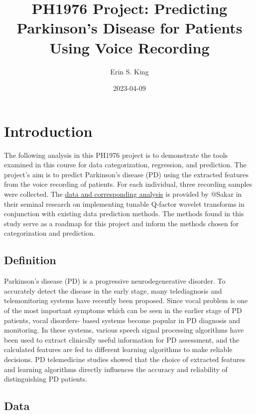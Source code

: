 \documentclass[
]{article}
\title{PH1976 Project: Predicting Parkinson's Disease for Patients Using Voice Recording}
\author{Erin S. King}
\date{2023-04-09}
\begin{document}
\maketitle

{
\setcounter{tocdepth}{2}
\tableofcontents
}
\hypertarget{introduction}{%
\section{Introduction}\label{introduction}}

The following analysis in this PH1976 project is to demonstrate the tools examined in this course for data categorization, regression, and prediction. The project's aim is to predict Parkinson's disease (PD) using the extracted features from the voice recording of patients. For each individual, three recording samples were collected. The \href{https://doi.org/10.1016/j.asoc.2018.10.022}{data and corresponding analysis} is provided by @Sakar in their seminal research on implementing tunable Q-factor wavelet transforms in conjunction with existing data prediction methods. The methods found in this study serve as a roadmap for this project and inform the methods chosen for categorization and prediction.

\hypertarget{definition}{%
\subsection{Definition}\label{definition}}

Parkinson's disease (PD) is a progressive neurodegenerative disorder. To accurately detect the disease in the
early stage, many telediagnosis and telemonitoring systems have recently been proposed. Since vocal problem is
one of the most important symptoms which can be seen in the earlier stage of PD patients, vocal disorders-
based systems become popular in PD diagnosis and monitoring. In these systems, various speech signal
processing algorithms have been used to extract clinically useful information for PD assessment, and the
calculated features are fed to different learning algorithms to make reliable decisions. PD telemedicine studies
showed that the choice of extracted features and learning algorithms directly influences the accuracy and
reliability of distinguishing PD patients.

\hypertarget{data}{%
\subsection{Data}\label{data}}
\end{document}
